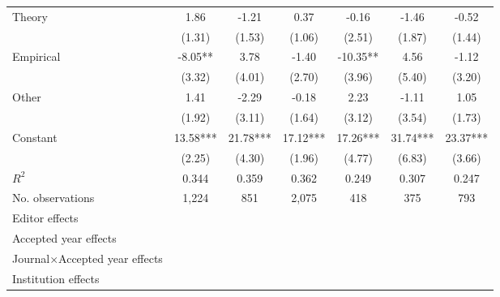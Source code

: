 \begin{table}
\begin{threeparttable}
\begin{tabular}{p{3.78cm}S@{}S@{}S@{}S@{}S@{}S@{}}
            Theory                        &        1.86   &       -1.21   &        0.37   &       -0.16   &       -1.46   &       -0.52   \\
                                          &      (1.31)   &      (1.53)   &      (1.06)   &      (2.51)   &      (1.87)   &      (1.44)   \\
            Empirical                     &       -8.05** &        3.78   &       -1.40   &      -10.35** &        4.56   &       -1.12   \\
                                          &      (3.32)   &      (4.01)   &      (2.70)   &      (3.96)   &      (5.40)   &      (3.20)   \\
            Other                         &        1.41   &       -2.29   &       -0.18   &        2.23   &       -1.11   &        1.05   \\
                                          &      (1.92)   &      (3.11)   &      (1.64)   &      (3.12)   &      (3.54)   &      (1.73)   \\
            Constant                      &       13.58***&       21.78***&       17.12***&       17.26***&       31.74***&       23.37***\\
                                          &      (2.25)   &      (4.30)   &      (1.96)   &      (4.77)   &      (6.83)   &      (3.66)   \\
            \midrule
            \(R^2\)                       &       0.344   &       0.359   &       0.362   &       0.249   &       0.307   &       0.247   \\
            No. observations              &       1,224   &         851   &       2,075   &         418   &         375   &         793   \\
            \midrule
            Editor effects       &           {}   &           {}   &           {}   &           {}   &           {}   &           {}   \\
            Accepted year effects         &           {}   &           {}   &               &           {}   &           {}   &               \\
            Journal\(\times\)Accepted year effects &               &               &           {}   &               &               &           {}   \\
            Institution effects           &           {}   &           {}   &           {}   &           {}   &           {}   &           {}   \\

\end{tabular}
\end{threeparttable}
\end{table}
